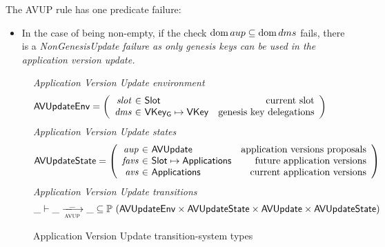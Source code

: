 The AVUP rule has one predicate failure:
\begin{itemize}
\item In the case of  being non-empty, if the check $\operatorname{dom} aup \subseteq
  \operatorname{dom} dms$ fails, there is a \em{NonGenesisUpdate} failure as only genesis keys
  can be used in the application version update.
\end{itemize}

\begin{figure}[htb]
  \emph{Application Version Update environment}
  \begin{equation*}
    \AVUpdateEnv =
    \left(
      \begin{array}{r@{~\in~}lr}
        \var{slot} & \Slot & \text{current slot}\\
        \var{dms} & \VKeyGen\mapsto\VKey & \text{genesis key delegations} \\
      \end{array}
    \right)
  \end{equation*}
  \emph{Application Version Update states}
  \begin{equation*}
    \AVUpdateState =
    \left(
      \begin{array}{r@{~\in~}lr}
        \var{aup} & \AVUpdate & \text{application versions proposals} \\
        \var{favs} & \Slot\mapsto\Applications & \text{future application versions} \\
        \var{avs} & \Applications & \text{current application versions} \\
      \end{array}
    \right)
  \end{equation*}
  \emph{Application Version Update transitions}
  \begin{equation*}
    \_ \vdash
    \var{\_} \trans{avup}{\_} \var{\_}
    \subseteq \powerset (\AVUpdateEnv \times \AVUpdateState \times \AVUpdate \times \AVUpdateState)
  \end{equation*}
  \caption{Application Version Update transition-system types}
  \label{fig:ts-types:av-update}
\end{figure}

